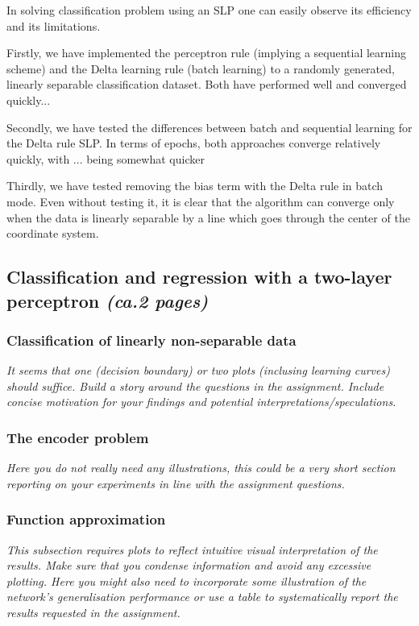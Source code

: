 \documentclass[a4paper]{article}
\begin{document}
In solving classification problem using an SLP one can easily observe its efficiency and its limitations.

Firstly, we have implemented the perceptron rule (implying a sequential learning scheme) and the Delta learning rule (batch learning) to a randomly generated, linearly separable classification dataset. Both have performed well and converged quickly...

Secondly, we have tested the differences between batch and sequential learning for the Delta rule SLP. In terms of epochs, both approaches converge relatively quickly, with ... being somewhat quicker

Thirdly, we have tested removing the bias term with the Delta rule in batch mode. Even without testing it, it is clear that the algorithm can converge only when the data is linearly separable by a line which goes through the center of the coordinate system. 



\subsection{Classification and regression with a two-layer perceptron \textit{(ca.2 pages)}}

\subsubsection{Classification of linearly non-separable data}
\textit{It seems that one (decision boundary) or two plots (inclusing learning curves) should suffice. Build a story around the questions in the assignment. Include concise motivation for your findings and potential interpretations/speculations.}

\subsubsection{The encoder problem}
\textit{Here you do not really need any illustrations, this could be a very short section reporting on your experiments in line with the assignment questions.}

\subsubsection{Function approximation}
\textit{This subsection requires plots to reflect intuitive visual interpretation of the results. Make sure that you condense information and avoid any excessive plotting. Here you might also need to incorporate some illustration of the network's generalisation performance or use a table to systematically report the results requested in the assignment.}
\end{document}
